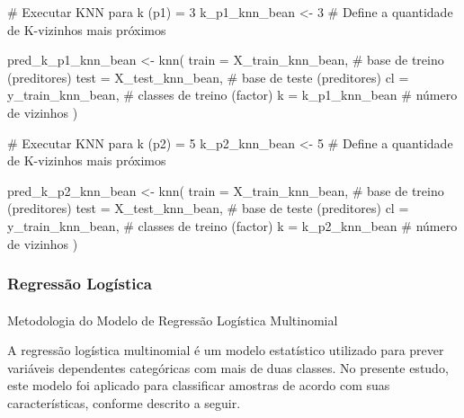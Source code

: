 \documentclass[
  letterpaper,
  DIV=11,
  numbers=noendperiod]{scrartcl}
\makeatletter
\let\oldparagraph\paragraph
\renewcommand{\paragraph}{
    \@ifstar
      \xxxParagraphStar
      \xxxParagraphNoStar
  }
\newcommand{\xxxParagraphStar}[1]{\oldparagraph*{#1}\mbox{}}
\newcommand{\xxxParagraphNoStar}[1]{\oldparagraph{#1}\mbox{}}
\newenvironment{Shaded}{\begin{snugshade}}{\end{snugshade}}
\newcommand{\AttributeTok}[1]{\textcolor[rgb]{0.40,0.45,0.13}{#1}}
\newcommand{\CommentTok}[1]{\textcolor[rgb]{0.37,0.37,0.37}{#1}}
\newcommand{\DecValTok}[1]{\textcolor[rgb]{0.68,0.00,0.00}{#1}}
\newcommand{\FunctionTok}[1]{\textcolor[rgb]{0.28,0.35,0.67}{#1}}
\newcommand{\NormalTok}[1]{\textcolor[rgb]{0.00,0.23,0.31}{#1}}
\newcommand{\OtherTok}[1]{\textcolor[rgb]{0.00,0.23,0.31}{#1}}
\makeatother
\begin{document}
\begin{Shaded}
\begin{Highlighting}[]
\CommentTok{\# Executar KNN para k (p1) = 3}
\NormalTok{k\_p1\_knn\_bean }\OtherTok{\textless{}{-}} \DecValTok{3} \CommentTok{\# Define a quantidade de K{-}vizinhos mais próximos}

\NormalTok{pred\_k\_p1\_knn\_bean }\OtherTok{\textless{}{-}} \FunctionTok{knn}\NormalTok{(}
  \AttributeTok{train =}\NormalTok{ X\_train\_knn\_bean,   }\CommentTok{\# base de treino (preditores)}
  \AttributeTok{test  =}\NormalTok{ X\_test\_knn\_bean,    }\CommentTok{\# base de teste  (preditores)}
  \AttributeTok{cl    =}\NormalTok{ y\_train\_knn\_bean,   }\CommentTok{\# classes de treino (factor)}
  \AttributeTok{k     =}\NormalTok{ k\_p1\_knn\_bean       }\CommentTok{\# número de vizinhos}
\NormalTok{)}

\CommentTok{\# Executar KNN para k (p2) = 5}
\NormalTok{k\_p2\_knn\_bean }\OtherTok{\textless{}{-}} \DecValTok{5} \CommentTok{\# Define a quantidade de K{-}vizinhos mais próximos}

\NormalTok{pred\_k\_p2\_knn\_bean }\OtherTok{\textless{}{-}} \FunctionTok{knn}\NormalTok{(}
  \AttributeTok{train =}\NormalTok{ X\_train\_knn\_bean,   }\CommentTok{\# base de treino (preditores)}
  \AttributeTok{test  =}\NormalTok{ X\_test\_knn\_bean,    }\CommentTok{\# base de teste  (preditores)}
  \AttributeTok{cl    =}\NormalTok{ y\_train\_knn\_bean,   }\CommentTok{\# classes de treino (factor)}
  \AttributeTok{k     =}\NormalTok{ k\_p2\_knn\_bean        }\CommentTok{\# número de vizinhos}
\NormalTok{)}
\end{Highlighting}
\end{Shaded}

\subsubsection{Regressão Logística}\label{regressuxe3o-loguxedstica}

\paragraph{Metodologia do Modelo de Regressão Logística
Multinomial}\label{metodologia-do-modelo-de-regressuxe3o-loguxedstica-multinomial}

A regressão logística multinomial é um modelo estatístico utilizado para
prever variáveis dependentes categóricas com mais de duas classes. No
presente estudo, este modelo foi aplicado para classificar amostras de
acordo com suas características, conforme descrito a seguir.
\end{document}
